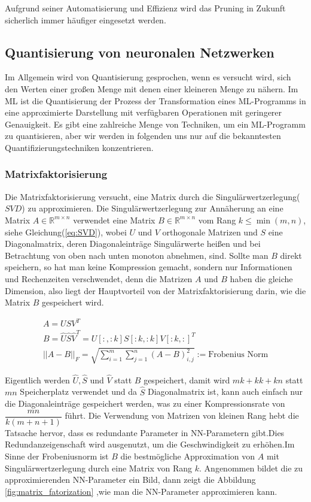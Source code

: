 \documentclass[12pt,a4paper]{scrartcl}
\numberwithin{equation}{section}
\newcommand{\R}{\mathbb{R}} %
\begin{document}
Aufgrund seiner Automatisierung und Effizienz wird das Pruning in Zukunft sicherlich immer häufiger eingesetzt werden.



\subsection{ Quantisierung von neuronalen Netzwerken}
Im Allgemein wird von Quantisierung gesprochen, wenn es versucht wird, sich den Werten einer großen Menge mit denen einer kleineren Menge zu nähern. Im \ac{ML} ist die Quantisierung der Prozess der Transformation eines ML-Programms in eine approximierte Darstellung mit verfügbaren Operationen mit geringerer Genauigkeit.
Es gibt eine zahlreiche Menge von Techniken, um ein ML-Programm zu quantisieren, aber wir werden in folgenden uns nur auf die bekanntesten Quantifizierungstechniken konzentrieren.
\subsubsection{Matrixfaktorisierung}
Die Matrixfaktorisierung versucht, eine Matrix durch die Singulärwertzerlegung($ SVD $) zu approximieren.
Die Singulärwertzerlegung zur Annäherung an eine Matrix $ A \in \R^{m\times n} $ verwendet eine Matrix $ B \in \R^{m\times n}  $ vom Rang $ k \le \min(m, n) $, siehe Gleichung(\ref{eq:SVD}), wobei $ U $ und $ V $ orthogonale Matrizen und $ S $ eine Diagonalmatrix, deren Diagonaleinträge Singulärwerte heißen und bei Betrachtung von oben nach unten monoton abnehmen, sind. Sollte man $ B $ direkt speichern, so hat man keine Kompression gemacht, sondern nur Informationen und Rechenzeiten verschwendet, denn die Matrizen $ A $ und $ B $ haben die gleiche Dimension, also liegt der Hauptvorteil von der Matrixfaktorisierung darin, wie die Matrix $ B $ gespeichert wird.

\begin{equation}\label{eq:SVD}
	\begin{array}{l}
	A = USV^T\\
	B = \widehat{U}\widehat{S}\widehat{V}^T =  U[:,:k] S[:k,:k] V[:k, :]^T \\
	{||A - B||_F} = \sqrt{\sum_{i = 1}^{m} \sum_{j =1}^{n} (A-B)_{i,j}^2} := \text{Frobenius Norm}
	\end{array}	
\end{equation}

Eigentlich werden $ \widehat{U} , \widehat{S} $ und $ \widehat{V} $ statt $ B $ gespeichert, damit wird $ m k + k k + k n $ statt $ mn $ Speicherplatz verwendet und da $ \widehat{S} $ Diagonalmatrix ist, kann auch einfach nur die Diagonaleinträge gespeichert werden, was zu einer Kompressionsrate von $ \dfrac{mn}{k(m+n+1)} $ führt. Die Verwendung von Matrizen von kleinen Rang hebt die Tatsache hervor, dass es redundante Parameter in \ac{NN}-Parametern gibt.Dies Redundanzeigenschaft wird ausgenutzt, um die Geschwindigkeit zu erhöhen\cite[Denton et al]{matrix quantization}.Im Sinne der Frobeniusnorm ist $ B $ die bestmögliche Approximation von $ A $ mit Singulärwertzerlegung durch eine Matrix von Rang $ k $.
Angenommen bildet die zu approximierenden NN-Parameter ein Bild, dann zeigt die Abbildung \ref{fig:matrix_fatorization} ,wie man die NN-Parameter approximieren kann.
\end{document}
